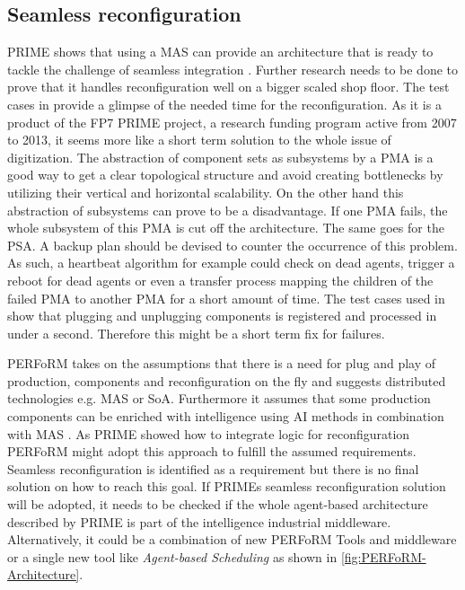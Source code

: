 \documentclass[conference,compsoc,hidelinks]{IEEEtran}
\begin{document}
\subsection{Seamless reconfiguration}
PRIME shows that using a MAS can provide an architecture that is ready to tackle the challenge of seamless integration \cite{Hybrid}. Further research needs to be done to prove that it handles reconfiguration well on a bigger scaled shop floor. The test cases in \cite{Hybrid} provide a glimpse of the needed time for the reconfiguration. As it is a product of the FP7 PRIME project, a research funding program active from 2007 to 2013, it seems more like a short term solution to the whole issue of digitization. The abstraction of component sets as subsystems by a PMA is a good way to get a clear topological structure and avoid creating bottlenecks by utilizing their vertical and horizontal scalability. On the other hand this abstraction of subsystems can prove to be a disadvantage. If one PMA fails, the whole subsystem of this PMA is cut off the architecture. The same goes for the PSA. A backup plan should be devised to counter the occurrence of this problem. As such, a heartbeat algorithm for example could check on dead agents, trigger a reboot for dead agents or even a transfer process mapping the children of the failed PMA to another PMA for a short amount of time. The test cases used in \cite{Hybrid} show that plugging and unplugging components is registered and processed in under a second. Therefore this might be a short term fix for failures.

PERFoRM takes on the assumptions that there is a need for plug and play of production, components and reconfiguration on the fly and suggests distributed technologies e.g. MAS or SoA. Furthermore it assumes that some production components can be enriched with intelligence using AI methods in combination with MAS \cite{SpecPERFoRM}. As PRIME showed how to integrate logic for reconfiguration PERFoRM might adopt this approach to fulfill the assumed requirements. Seamless reconfiguration is identified as a requirement but there is no final solution on how to reach this goal. If PRIMEs seamless reconfiguration solution will be adopted, it needs to be checked if the whole agent-based architecture described by PRIME is part of the intelligence industrial middleware. Alternatively, it could be a combination of new PERFoRM Tools and middleware or a single new tool like \emph{Agent-based Scheduling} as shown in \autoref{fig:PERFoRM-Architecture}. 
\end{document}
